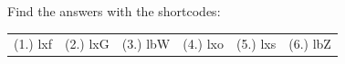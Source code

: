     
  \label{m38786**end}
          
       
    
  \label{1fc5ba69690764517c30802fdf7b1905**end}
    
\par {} Find the answers with the shortcodes:
 \par \begin{tabular}[h]{cccccc}
 (1.) lxf  &  (2.) lxG  &  (3.) lbW  &  (4.) lxo  &  (5.) lxs  &  (6.) lbZ  & \end{tabular}



